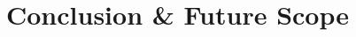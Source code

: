 \documentclass[../Report.tex]{subfiles}
\begin{document}
\chapter{Conclusion \& Future Scope}
\end{document}
